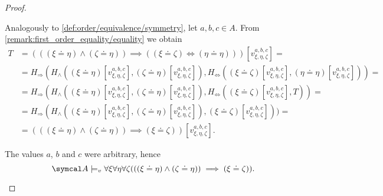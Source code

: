 \begin{proof}
\begin{description}
     Analogously to \ref{def:order/equivalence/symmetry}, let \( a, b, c \in A \). From \cref{remark:first_order_equality/equality} we obtain
    \begin{align*}
      T &=
      (((\xi \doteq \eta) \land (\zeta \doteq \eta)) \implies ((\xi \doteq \zeta) \iff (\eta \doteq \eta)))[v_{\xi,\eta,\zeta}^{a,b,c}]
      = \\ &=
      H_\Rightarrow(H_\land((\xi \doteq \eta)[v_{\xi,\eta,\zeta}^{a,b,c}], (\zeta \doteq \eta)[v_{\xi,\eta,\zeta}^{a,b,c}]), H_\Leftrightarrow((\xi \doteq \zeta)[v_{\xi,\eta,\zeta}^{a,b,c}], (\eta \doteq \eta)[v_{\xi,\eta,\zeta}^{a,b,c}]))
      = \\ &=
      H_\Rightarrow(H_\land((\xi \doteq \eta)[v_{\xi,\eta,\zeta}^{a,b,c}], (\zeta \doteq \eta)[v_{\xi,\eta,\zeta}^{a,b,c}]), H_\Leftrightarrow((\xi \doteq \zeta)[v_{\xi,\eta,\zeta}^{a,b,c}], T))
      = \\ &=
      H_\Rightarrow(H_\land((\xi \doteq \eta)[v_{\xi,\eta,\zeta}^{a,b,c}], (\zeta \doteq \eta)[v_{\xi,\eta,\zeta}^{a,b,c}]), (\xi \doteq \zeta)[v_{\xi,\eta,\zeta}^{a,b,c}]))
      = \\ &=
      (((\xi \doteq \eta) \land (\zeta \doteq \eta)) \implies (\xi \doteq \zeta))[v_{\xi,\eta,\zeta}^{a,b,c}].
    \end{align*}

    The values \( a \), \( b \) and \( c \) were arbitrary, hence
    \begin{equation*}
      \Cal{A} \models_v \forall \xi \forall \eta \forall \zeta (((\xi \doteq \eta) \land (\zeta \doteq \eta)) \implies (\xi \doteq \zeta)).
    \end{equation*}
  \end{description}
\end{proof}

